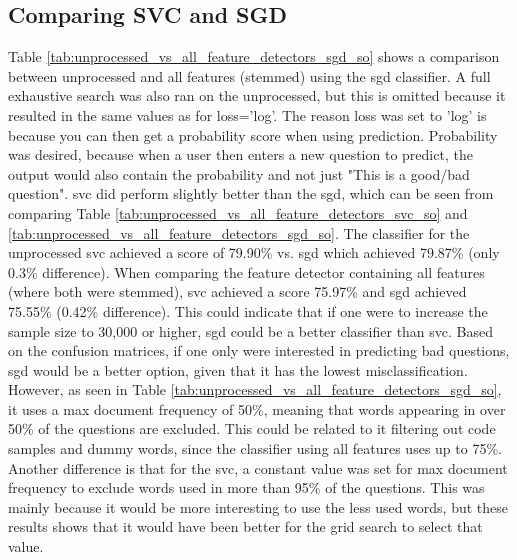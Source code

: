 \subsection{Comparing SVC and SGD}
\label{sec:comparing_svc_sgd}



Table \ref{tab:unprocessed_vs_all_feature_detectors_sgd_so} shows a comparison between unprocessed and all features (stemmed) using the \gls{sgd} classifier.
A full exhaustive search was also ran on the unprocessed, but this is omitted because it resulted in the same values as for loss='log'.
The reason loss was set to 'log' is because you can then get a probability score when using prediction.
Probability was desired, because when a user then enters a new question to predict, the output would also contain the probability and not just "This is a good/bad question".
\vspace{0.5em}\newline
\gls{svc} did perform slightly better than the \gls{sgd}, which can be seen from comparing Table \ref{tab:unprocessed_vs_all_feature_detectors_svc_so} and \ref{tab:unprocessed_vs_all_feature_detectors_sgd_so}.
The classifier for the unprocessed \gls{svc} achieved a score of 79.90\% vs. \gls{sgd} which achieved 79.87\% (only 0.3\% difference).
When comparing the feature detector containing all features (where both were stemmed), \gls{svc} achieved a score 75.97\% and \gls{sgd} achieved 75.55\% (0.42\% difference). 
This could indicate that if one were to increase the sample size to 30,000 or higher, \gls{sgd} could be a better classifier than \gls{svc}.
Based on the confusion matrices, if one only were interested in predicting bad questions, \gls{sgd} would be a better option, given that it has the lowest misclassification.
However, as seen in Table \ref{tab:unprocessed_vs_all_feature_detectors_sgd_so}, it uses a max document frequency of 50\%, meaning that words appearing in over 50\% of the questions are excluded.
This could be related to it filtering out code samples and dummy words, since the classifier using all features uses up to 75\%.
Another difference is that for the \gls{svc}, a constant value was set for max document frequency to exclude words used in more than 95\% of the questions. 
This was mainly because it would be more interesting to use the less used words, but these results shows that it would have been better for the grid search to select that value.
